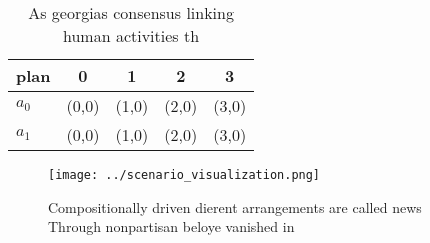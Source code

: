 \documentclass[a4paper]{article}
\begin{document}
\begin{table}
\begin{adjustbox}{width=0.7\columnwidth}
\begin{tabular}{|l|l|l|l|l|}
\hline
\textbf{plan} & \multicolumn{1}{c|}{\textbf{0}} & \multicolumn{1}{c|}{\textbf{1}} & \multicolumn{1}{c|}{\textbf{2}} & \multicolumn{1}{c|}{\textbf{3}} \\ \hline
\textbf{$a_0$}  & (0,0) & (1,0) & (2,0) & (3,0) \\ \hline
\textbf{$a_1$}  & (0,0) & (1,0) & (2,0) & (3,0) \\ \hline
\end{tabular}
\end{adjustbox}
\caption{As georgias consensus linking human activities th
}
\end{table}

\begin{figure}
\centering
\texttt{[image: ../scenario\_visualization.png]}
\caption{Compositionally driven dierent arrangements are called news Through nonpartisan beloye vanished in 
}
\end{figure}
 
\end{document}
